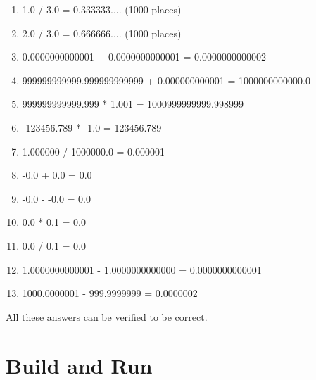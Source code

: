 \documentclass[15pt]{article}
\begin{document}
    \begin{enumerate}
        \item 1.0 / 3.0 = 0.333333.... (1000 places)
        \item 2.0 / 3.0 = 0.666666.... (1000 places)
        \item 0.0000000000001 + 0.0000000000001 = 0.0000000000002
        \item 999999999999.999999999999 + 0.000000000001 = 1000000000000.0
        \item 999999999999.999 * 1.001 = 1000999999999.998999
        \item -123456.789 * -1.0 = 123456.789
        \item 1.000000 / 1000000.0 = 0.000001
        \item -0.0 + 0.0 = 0.0
        \item -0.0 - -0.0 = 0.0
        \item 0.0 * 0.1 = 0.0
        \item 0.0 / 0.1 = 0.0
        \item 1.0000000000001 - 1.0000000000000 = 0.0000000000001
        \item 1000.0000001 - 999.9999999 = 0.0000002
    \end{enumerate}


    All these answers can be verified to be correct.

\section{Build and Run} \label{bnr}
\end{document}
